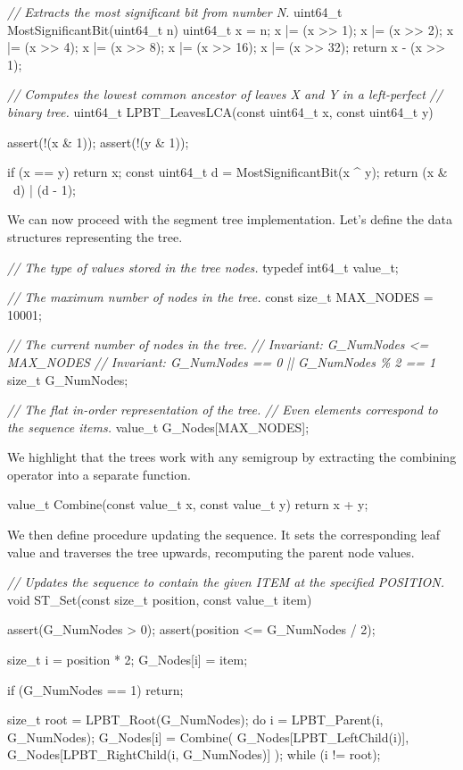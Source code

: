 \documentclass{article}
\begin{document}
\begin{code}[c]
\emph{// Extracts the most significant bit from number N.}
uint64_t MostSignificantBit(uint64_t n) {
    uint64_t x = n;
    x |= (x >> 1);
    x |= (x >> 2);
    x |= (x >> 4);
    x |= (x >> 8);
    x |= (x >> 16);
    x |= (x >> 32);
    return x - (x >> 1);
}

\emph{// Computes the lowest common ancestor of leaves X and Y in a left-perfect}
\emph{// binary tree.}
uint64_t LPBT_LeavesLCA(const uint64_t x, const uint64_t y) {
    assert(!(x & 1));
    assert(!(y & 1));

    if (x == y) return x;
    const uint64_t d = MostSignificantBit(x ^ y);
    return (x & ~d) | (d - 1);
}
\end{code}

We can now proceed with the segment tree implementation.
Let's define the data structures representing the tree.

\begin{code}[c]
\emph{// The type of values stored in the tree nodes.}
typedef int64_t value_t;

\emph{// The maximum number of nodes in the tree.}
const size_t MAX_NODES = 10001;

\emph{// The current number of nodes in the tree.}
\emph{// Invariant: G_NumNodes <= MAX_NODES}
\emph{// Invariant: G_NumNodes == 0 || G_NumNodes \% 2 == 1}
size_t G_NumNodes;

\emph{// The flat in-order representation of the tree.}
\emph{// Even elements correspond to the sequence items.}
value_t G_Nodes[MAX_NODES];
\end{code}

We highlight that the trees work with any semigroup by extracting the combining operator into a separate function.

\begin{code}[c]
value_t Combine(const value_t x, const value_t y) {
    return x + y;
}
\end{code}

We then define procedure  updating the sequence.
It sets the corresponding leaf value and traverses the tree upwards, recomputing the parent node values.

\begin{code}[c]
\emph{// Updates the sequence to contain the given ITEM at the specified POSITION.}
void ST_Set(const size_t position, const value_t item) {
    assert(G_NumNodes > 0);
    assert(position <= G_NumNodes / 2);

    size_t i = position * 2;
    G_Nodes[i] = item;

    if (G_NumNodes == 1) return;

    size_t root = LPBT_Root(G_NumNodes);
    do {
        i = LPBT_Parent(i, G_NumNodes);
        G_Nodes[i] = Combine(
            G_Nodes[LPBT_LeftChild(i)],
            G_Nodes[LPBT_RightChild(i, G_NumNodes)]
        );
    } while (i != root);
}
\end{code}
\end{document}
